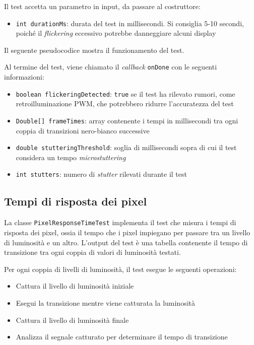 Il test accetta un parametro in input, da passare al costruttore:\begin{itemize}
	\item \texttt{int durationMs}: durata del test in millisecondi. Si consiglia 5-10 secondi, poiché il \textit{flickering} eccessivo potrebbe danneggiare alcuni display
\end{itemize}

Il seguente pseudocodice mostra il funzionamento del test.


Al termine del test, viene chiamato il \textit{callback} \texttt{onDone} con le seguenti informazioni:\begin{itemize}
	\item \texttt{boolean flickeringDetected}: \texttt{true} se il test ha rilevato rumori, come retroilluminazione PWM, che potrebbero ridurre l'accuratezza del test
	\item \texttt{Double[] frameTimes}: array contenente i tempi in millisecondi tra ogni coppia di transizioni nero-bianco successive
	\item \texttt{double stutteringThreshold}: soglia di millisecondi sopra di cui il test considera un tempo \textit{microstuttering}
	\item \texttt{int stutters}: numero di \textit{stutter} rilevati durante il test
\end{itemize}

\subsection{Tempi di risposta dei pixel}
La classe \texttt{PixelResponseTimeTest} implementa il test che misura i tempi di risposta dei pixel, ossia il tempo che i pixel impiegano per passare tra un livello di luminosità e un altro. L'output del test è una tabella contenente il tempo di transizione tra ogni coppia di valori di luminosità testati.

Per ogni coppia di livelli di luminosità, il test esegue le seguenti operazioni:\begin{itemize}
	\item Cattura il livello di luminosità iniziale
	\item Esegui la transizione mentre viene catturata la luminosità
	\item Cattura il livello di luminosità finale
	\item Analizza il segnale catturato per determinare il tempo di transizione
\end{itemize}

